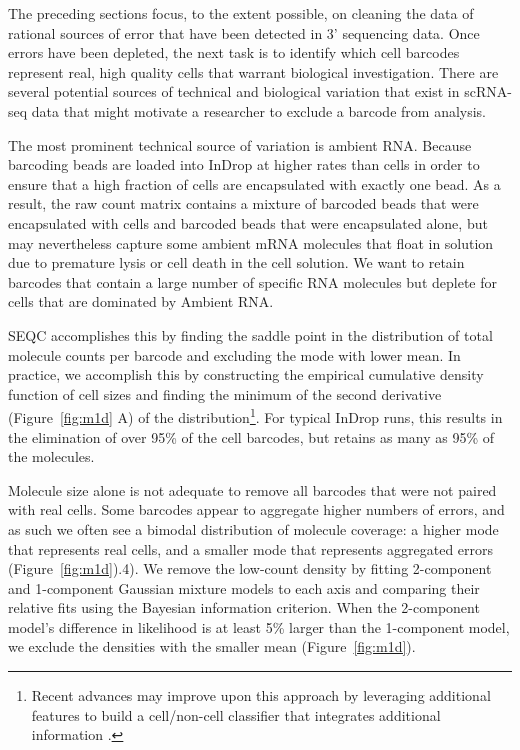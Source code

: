 The preceding sections focus, to the extent possible,  on cleaning the data of rational sources of error that have been detected in 3' sequencing data. 
Once errors have been depleted, the next task is to identify which cell barcodes represent real, high quality cells that warrant biological investigation. 
There are several potential sources of technical and biological variation that exist in scRNA-seq data that might motivate a researcher to exclude a barcode from analysis. 

The most prominent technical source of variation is ambient RNA\@. 
Because barcoding beads are loaded into InDrop at higher rates than cells in order to ensure that a high fraction of cells are encapsulated with exactly one bead. 
As a result, the raw count matrix contains a mixture of barcoded beads that were encapsulated with cells and barcoded beads that were encapsulated alone, but may nevertheless capture some ambient mRNA molecules that float in solution due to premature lysis or cell death in the cell solution. 
We want to retain barcodes that contain a large number of specific RNA molecules but deplete for cells that are dominated by Ambient RNA\@. 

SEQC accomplishes this by finding the saddle point in the distribution of total molecule counts per barcode and excluding the mode with lower mean. 
In practice, we accomplish this by constructing the empirical cumulative density function of cell sizes and finding the minimum of the second derivative (Figure~\ref{fig:m1d} A) of the distribution\footnote{Recent advances may improve upon this approach by leveraging additional features to build a cell/non-cell classifier that integrates additional information \citep{Petukhov2017}.}.
For typical InDrop runs, this results in the elimination of over 95\% of the cell barcodes, but retains as many as 95\% of the molecules.

Molecule size alone is not adequate to remove all barcodes that were not paired with real cells. 
Some barcodes appear to aggregate higher numbers of errors, and as such we often see a bimodal distribution of molecule coverage: a higher mode that represents real cells, and a smaller mode that represents aggregated errors (Figure~\ref{fig:m1d}).4). 
We remove the low-count density by fitting 2-component and 1-component Gaussian mixture models to each axis and comparing their relative fits using the Bayesian information criterion. 
When the 2-component model's difference in likelihood is at least 5\% larger than the 1-component model, we exclude the densities with the smaller mean (Figure~\ref{fig:m1d}).

